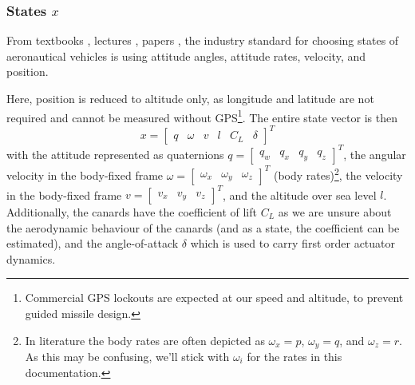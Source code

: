 \subsubsection{States $x$}
From textbooks \cite{zipfel2007, stevens2015, tewari2011},  lectures \cite{theis2023}, papers \cite{minh2012, theis2015}, the industry standard for choosing states of aeronautical vehicles is using attitude angles, attitude rates, velocity, and position. 

Here, position is reduced to altitude only, as longitude and latitude are not required and cannot be measured without GPS\footnote{Commercial GPS lockouts are expected at our speed and altitude, to prevent guided missile design.}. 
The entire state vector is then
\begin{equation}
    x =  \begin{bmatrix}
    q & \omega & v & l & C_L & \delta
    \end{bmatrix}^T
    \label{eq:model-state-vector}
\end{equation}
with the attitude represented as quaternions $q = \begin{bmatrix} q_w & q_x & q_y & q_z \end{bmatrix}^T$, the angular velocity in the body-fixed frame $\omega = \begin{bmatrix} \omega_x & \omega_y & \omega_z \end{bmatrix}^T$ (body rates)\footnote{In literature the body rates are often depicted as $\omega_x = p$, $\omega_y = q$, and $\omega_z = r$. As this may be confusing, we'll stick with $\omega_i$ for the rates in this documentation.}, the velocity in the body-fixed frame $v = \begin{bmatrix} v_x & v_y & v_z \end{bmatrix}^T$, and the altitude over sea level $l$. 
Additionally, the canards have the coefficient of lift $C_L$ as we are unsure about the aerodynamic behaviour of the canards (and as a state, the coefficient can be estimated), and the angle-of-attack $\delta$ which is used to carry first order actuator dynamics.


